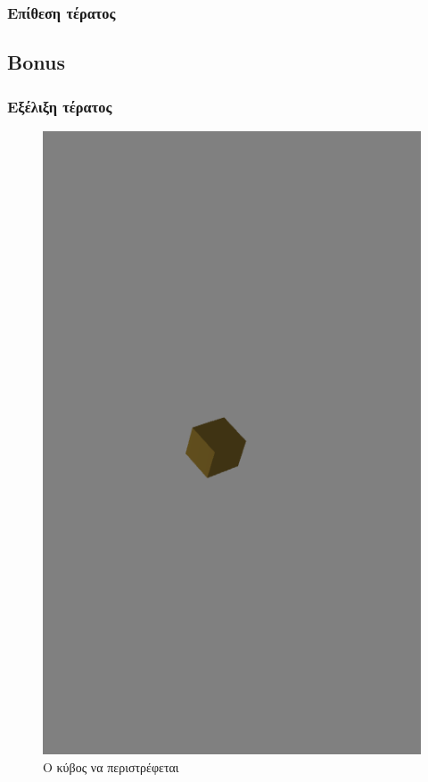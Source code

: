 \documentclass[11pt]{scrartcl} %
\begin{document}
\subsubsection{Επίθεση τέρατος}

\subsection{Bonus}

\subsubsection{Εξέλιξη τέρατος}

\begin{figure}[H]
	\begin{center}
		\includegraphics[height=.5\textheight]{./assets/cube.png}
	\end{center}
	\caption{Ο κύβος να περιστρέφεται}
\end{figure}
\end{document}
